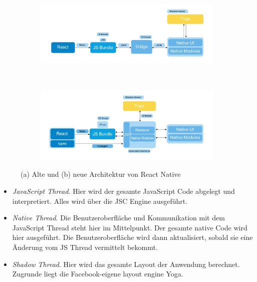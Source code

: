 \begin{figure}[tbt]
	\begin{subfigure}{\textwidth}
		\centering
		\includegraphics[scale=0.4]{Theoretische_Grundlagen/images/reactnative_architecture_old.png}
		\caption{}
		\label{fig:reactnative_architecture_old}
	\end{subfigure}\\
	\begin{subfigure}{\textwidth}
		\centering
		\includegraphics[scale=0.4]{Theoretische_Grundlagen/images/reactnative_architecture.png}
		\caption{}
		\label{fig:reactnative_architecture}
	\end{subfigure}
	\caption[Alte und neue Architektur von React Native]{(a) Alte und (b) neue Architektur von React Native \protect \footnotemark}
\end{figure}

\begin{itemize}
	\item \textit{JavaScript Thread}. Hier wird der gesamte JavaScript Code abgelegt und interpretiert. Alles wird über die JSC Engine ausgeführt.
	\item \textit{Native Thread}. Die Benutzeroberfläche und Kommunikation mit dem JavaScript Thread steht hier im Mittelpunkt. Der gesamte native Code wird hier ausgeführt. Die Benutzeroberfläche wird dann aktualisiert, sobald sie eine Änderung vom JS Thread vermittelt bekommt.
	\item \textit{Shadow Thread}. Hier wird das gesamte Layout der Anwendung berechnet. Zugrunde liegt die Facebook-eigene layout engine \glqq Yoga\grqq .
\end{itemize}

